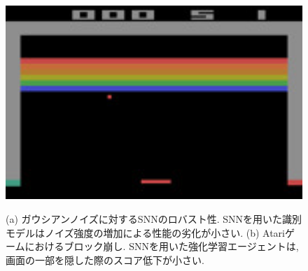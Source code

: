 \begin{figure}[htbp]
    \centering

    \begin{minipage}{0.45\textwidth}
        \centering
        
        \label{fig:snnslam}
    \end{minipage}
    \hspace{0.02\textwidth}
    \begin{minipage}{0.45\textwidth}
        \centering
        \includegraphics[width=1.0\textwidth]{Static/chap1_robust_atari.jpg}
        \label{tab:spinnaker}
    \end{minipage}

    \caption[SNNのロバスト性]{
        (a) ガウシアンノイズに対するSNNのロバスト性. 
        SNNを用いた識別モデルはノイズ強度の増加による性能の劣化が小さい.
        (b) Atariゲームにおけるブロック崩し.
        SNNを用いた強化学習エージェントは, 画面の一部を隠した際のスコア低下が小さい.
    }
\end{figure}

